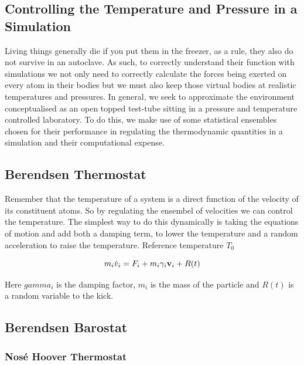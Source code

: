 \subsection{Controlling the Temperature and Pressure in a Simulation}
Living things generally die if you put them in the freezer, as a rule, they also do not survive in an autoclave. As such, to correctly understand their function with simulations we not only need to correctly calculate the forces being exerted on every atom in their bodies but we must also keep those virtual bodies at realistic temperatures and pressures. In general, we seek to approximate the environment conceptualised as an open topped test-tube sitting in a pressure and temperature controlled laboratory. To do this, we make use of some statistical ensembles chosen for their performance in regulating the thermodynamic quantities in a simulation and their computational expense.  

\subsection{Berendsen Thermostat}
Remember that the temperature of a system is a direct function of the velocity of its constituent atoms. So by regulating the ensembel of velocities we can control the temperature. The simplest way to do this dynamically is taking the equations of motion and add both a damping term, to lower the temperature and a random acceleration to raise the temperature. 
Reference temperature $T_0$ 

\begin{equation}
	m_i  \dot{v} _i = F_i + m_i \gamma_i \bold{v}_i + R(t)
\end{equation}

Here $gamma_i$ is the damping factor, $m_i$ is the mass of the particle and $R(t)$ is a random variable to the kick.


\subsection{Berendsen Barostat}

\subsubsection{Nos\'e Hoover Thermostat}


